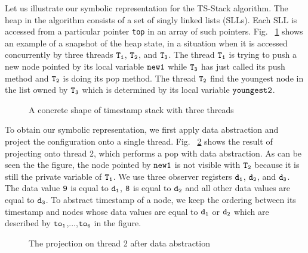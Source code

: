 Let us illustrate our symbolic representation for the TS-Stack algorithm.
The heap in the algorithm consists of a set of singly linked lists (SLLs). Each
SLL is accessed from a particular pointer {\tt top} in an array of such pointers.
Fig. ~\ref{fig:tsshape} shows an example of a snapshot of the heap state, in a situation when
it is accessed concurrently by three threads $\tt T_1$, $\tt T_2$, and $\tt T_3$. The thread $\tt T_1$ is trying to push a new node pointed by its local variable $\tt new1$ while $\tt T_3$ has just called its push method and $\tt T_2$ is doing its pop method. The thread $\tt T_2$ find the youngest node in the list owned by $\tt T_3$ which is determined by its local variable $\tt youngest2$.
\begin{figure}
	
\caption{A concrete shape of timestamp stack with three threads}
\label{fig:tsshape}
\end{figure} 

To obtain our symbolic representation, we first apply data abstraction and
project the configuration onto a single thread. Fig. ~\ref{fig:tsdabsshape} shows the result
of projecting onto thread 2, which performs a pop with data abstraction. As can be seen the the figure, the node pointed by $\tt new1$ is not visible with $\tt T_2$ because it is still the private variable of $\tt T_1$. We use three observer registers $\tt d_1$, $\tt d_2$, and $\tt d_3$. The data value $\tt 9$ is equal to $\tt d_1$, $\tt 8$ is equal to $\tt d_2$ and all other data values are equal to $\tt d_3$. To abstract timestamp of a node, we keep the ordering between its timestamp and nodes whose data values are equal to $\tt d_1$ or $\tt d_2$ which are described by $\tt to_1$,...,$\tt to_6$ in the figure.
\begin{figure}
	
\caption{The projection on thread 2 after data abstraction}
\label{fig:tsdabsshape}
\end{figure} 

